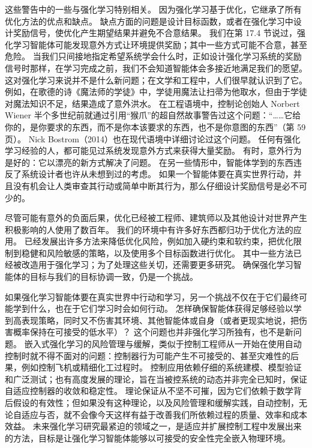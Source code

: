 \documentclass[UTF8, 12pt, fontset=fandol, oneside]{ctexart}
\begin{document}
这些警告中的一些与强化学习特别相关。
因为强化学习基于优化，它继承了所有优化方法的优点和缺点。
缺点方面的问题是设计目标函数，或者在强化学习中设计奖励信号，使优化产生期望结果并避免不合意结果。
我们在第 17.4 节说过，强化学习智能体可能发现意外方式让环境提供奖励；其中一些方式可能不合意，甚至危险。
当我们只间接地指定希望系统学会什么时，正如设计强化学习系统的奖励信号时那样，在学习完成之前，我们不会知道智能体会多接近地满足我们的愿望。
这对强化学习来说并不是什么新问题；在文学和工程中，人们很早就认识到了它。
例如，在歌德的诗《魔法师的学徒》中，学徒用魔法让扫帚为他取水，但由于学徒对魔法知识不足，结果造成了意外洪水。
在工程语境中，控制论创始人 Norbert Wiener 半个多世纪前就通过引用“猴爪”的超自然故事警告过这个问题：“……它给你的，是你要求的东西，而不是你本该要求的东西，也不是你意图的东西”（第 59 页）。
Nick Bostrom（2014）也在现代语境中详细讨论过这个问题。
任何有强化学习经验的人，都可能见过系统发现意外方式来获得大量奖励。
有时，意外行为是好的：它以漂亮的新方式解决了问题。
在另一些情形中，智能体学到的东西违反了系统设计者也许从未想到过的考虑。
如果一个智能体要在真实世界行动，并且没有机会让人类审查其行动或简单中断其行为，那么仔细设计奖励信号是必不可少的。

尽管可能有意外的负面后果，优化已经被工程师、建筑师以及其他设计对世界产生积极影响的人使用了数百年。
我们的环境中有许多好东西都归功于优化方法的应用。
已经发展出许多方法来降低优化风险，例如加入硬约束和软约束，把优化限制到稳健和风险敏感的策略，以及使用多个目标函数进行优化。
其中一些方法已经被改造用于强化学习；为了处理这些关切，还需要更多研究。
确保强化学习智能体的目标与我们的目标协调一致，仍是一个挑战。

如果强化学习智能体要在真实世界中行动和学习，另一个挑战不仅在于它们最终可能学到什么，也在于它们学习时会如何行动。
怎样确保智能体获得足够经验以学到高表现策略，同时又不伤害其环境、其他智能体或自身（或者更现实地说，把伤害概率保持在可接受的低水平）？
这个问题也并非强化学习所独有，也不是新问题。
嵌入式强化学习的风险管理与缓解，类似于控制工程师从一开始在使用自动控制时就不得不面对的问题：控制器行为可能产生不可接受的、甚至灾难性的后果，例如控制飞机或精细化工过程时。
控制应用依赖仔细的系统建模、模型验证和广泛测试；也有高度发展的理论，旨在当被控系统的动态并非完全已知时，保证自适应控制器的收敛和稳定性。
理论保证从不坚不可摧，因为它们依赖于数学背后假设的有效性；但如果没有这种理论，以及风险管理和缓解实践，自动控制，无论自适应与否，就不会像今天这样有益于改善我们所依赖过程的质量、效率和成本效益。
未来强化学习研究最紧迫的领域之一，是适应并扩展控制工程中发展出来的方法，目标是让强化学习智能体能够以可接受的安全性完全嵌入物理环境。
\end{document}
